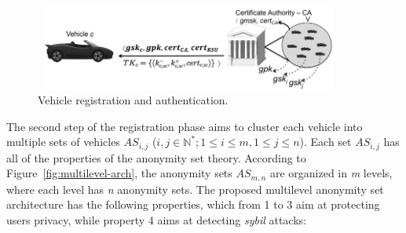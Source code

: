 \documentclass[preprint,12pt]{elsarticle}
\newcommand{\protocolname}{$ASAP$-V}
\begin{document}

\begin{figure}[ht]
\centering
\includegraphics[width=4in, height=1.1in]{figures/registro-veiculo-en.jpg}
\caption{Vehicle registration and authentication.}
\label{fig:vehicle-registration}
\end{figure}

The second step of the registration phase aims to cluster each vehicle into multiple sets of vehicles $AS_{i,j}$ ($i, j \in \mathbb{N}^{*}; 1 \le i \le m, 1 \le j \le n$). Each set $AS_{i,j}$  has all of the properties of the anonymity set theory. According to Figure~\ref{fig:multilevel-arch}, the anonymity sets $AS_{m,n}$ are organized in \textit{m} levels, where each level has \textit{n} anonymity sets. The proposed multilevel anonymity set architecture has the following properties, which from 1 to 3 aim at protecting users privacy, while property 4 aims at detecting \textit{sybil} attacks:
\end{document}
